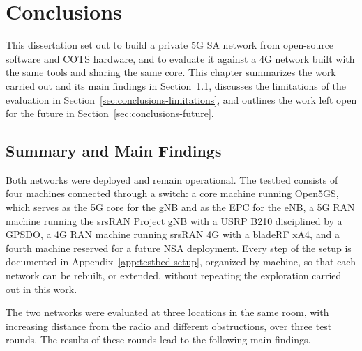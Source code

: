 %


\chapter{Conclusions}
\label{cha:conclusions}

This dissertation set out to build a private 5G \gls{SA} network from open-source software and \gls{COTS} hardware, and to evaluate it against a 4G network built with the same tools and sharing the same core. This chapter summarizes the work carried out and its main findings in Section~\ref{sec:conclusions-summary}, discusses the limitations of the evaluation in Section~\ref{sec:conclusions-limitations}, and outlines the work left open for the future in Section~\ref{sec:conclusions-future}.

\section{Summary and Main Findings}
\label{sec:conclusions-summary}

Both networks were deployed and remain operational. The testbed consists of four machines connected through a switch: a core machine running Open5GS, which serves as the 5G core for the \gls{gNB} and as the \gls{EPC} for the \gls{eNB}, a 5G \gls{RAN} machine running the srsRAN Project \gls{gNB} with a USRP B210 disciplined by a \gls{GPSDO}, a 4G \gls{RAN} machine running srsRAN 4G with a bladeRF xA4, and a fourth machine reserved for a future \gls{NSA} deployment. Every step of the setup is documented in Appendix~\ref{app:testbed-setup}, organized by machine, so that each network can be rebuilt, or extended, without repeating the exploration carried out in this work.

The two networks were evaluated at three locations in the same room, with increasing distance from the radio and different obstructions, over three test rounds. The results of these rounds lead to the following main findings.

